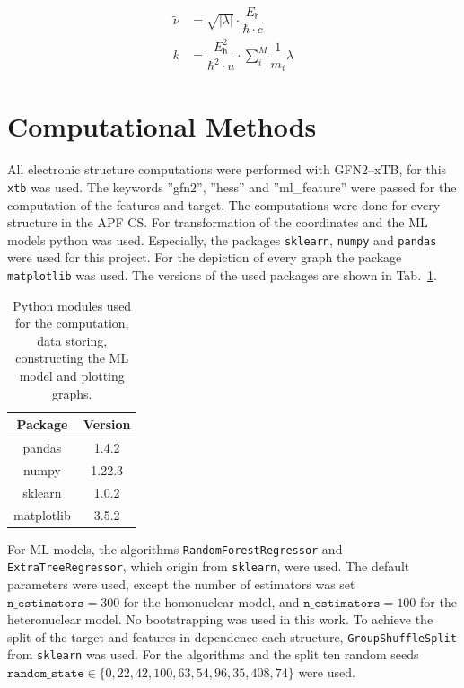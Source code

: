 \begin{subequations}
\begin{align}
	\label{eq:WN}
	\tilde{\nu} &= \sqrt{|\lambda|} \cdot \dfrac{E_\mathsf{h}}{\hbar \cdot c}\\
	\label{eq:FC}
	k &=   \dfrac{E_\mathsf{h}^2}{\hbar^2 \cdot u} \cdot \sum^M_i \dfrac{1}{m_i} \lambda
\end{align}
\end{subequations}

\newpage
\section{Computational Methods}

All electronic structure computations were performed with \mbox{GFN2--xTB}\supercite{Bannwarth2019_GFN2xTB}, for this \texttt{xtb}\supercite{Bannwarth2021_xTB} was used.
The keywords ''gfn2'', ''hess'' and ''ml\_feature'' were passed for the computation of the features and target.
The computations were done for every structure in the APF CS. 
For transformation of the coordinates and the ML models python was used.
Especially, the packages \texttt{sklearn}\supercite{scikit-learn}, \texttt{numpy}\supercite{numpy} and \texttt{pandas}\supercite{pandas.Paper,pandas.software} were used for this project.
For the depiction of every graph the package \texttt{matplotlib}\supercite{Hunter2007} was used.
The versions of the used packages are shown in Tab.~\ref{tab:Packages}.
\begin{table}[H]
    \centering
	\caption[List of python models used.]{Python modules used for the computation, data storing, constructing the ML model and plotting graphs.}
        \begin{tabular}{c c }
			\hline
			Package & Version \\
			\hline
			pandas & 1.4.2 \\
			numpy & 1.22.3 \\
			sklearn & 1.0.2\\
			matplotlib & 3.5.2\\
			\hline
        \end{tabular}
    \label{tab:Packages}
\end{table}

For ML models,
the algorithms \texttt{RandomForestRegressor} and \texttt{ExtraTreeRegressor},
which origin from \texttt{sklearn}, were used. 
The default parameters were used, except the number of estimators was set $\texttt{n\_estimators}=300$ for the homonuclear model,
and $\texttt{n\_estimators}=100$ for the heteronuclear model.
No bootstrapping was used in this work.
To achieve the split of the target and features in dependence each structure, \texttt{GroupShuffleSplit} from \texttt{sklearn} was used.
For the algorithms and the split ten random seeds $\texttt{random\_state} \in \{0,22,42,100,63,54,96,35,408,74\}$ were used.